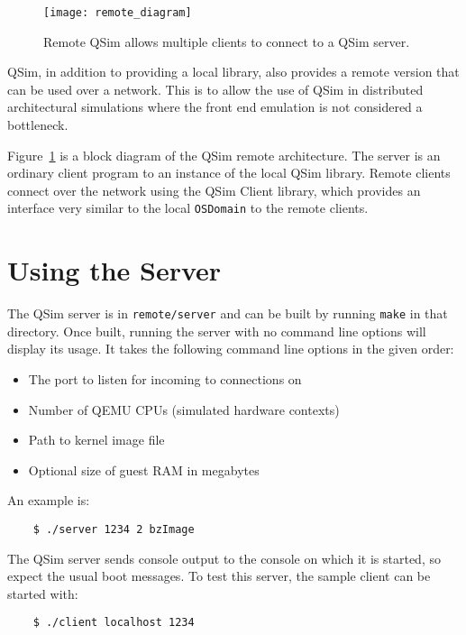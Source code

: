 \documentclass[letterpaper, 10pt]{book}
\begin{document}
\begin{figure}
\begin{centering}
\texttt{[image: remote\_diagram]}
\caption{Remote QSim allows multiple clients to connect to a QSim server.}
\label{fig:remote}
\end{centering}
\end{figure}

QSim, in addition to providing a local library, also provides a remote version
that can be used over a network. This is to allow the use of QSim in
distributed architectural simulations where the front end emulation is not
considered a bottleneck.

Figure~\ref{fig:remote} is a block diagram of the QSim remote architecture. The
server is an ordinary client program to an instance of the local QSim library.
Remote clients connect over the network using the QSim Client library, which
provides an interface very similar to the local \texttt{OSDomain} to the remote
clients.

\section{Using the Server}

The QSim server is in \texttt{remote/server} and can be built by running
\texttt{make} in that directory. Once built, running the server with no command
line options will display its usage. It takes the following command line options
in the given order:

\begin{itemize}
  \item{The port to listen for incoming to connections on}
  \item{Number of QEMU CPUs (simulated hardware contexts)}
  \item{Path to kernel image file}
  \item{Optional size of guest RAM in megabytes}
\end{itemize}

An example is:

\begin{verbatim}
    $ ./server 1234 2 bzImage
\end{verbatim}

The QSim server sends console output to the console on which it is started, so
expect the usual boot messages. To test this server, the sample client can be
started with:

\begin{verbatim}
    $ ./client localhost 1234
\end{verbatim}
\end{document}
